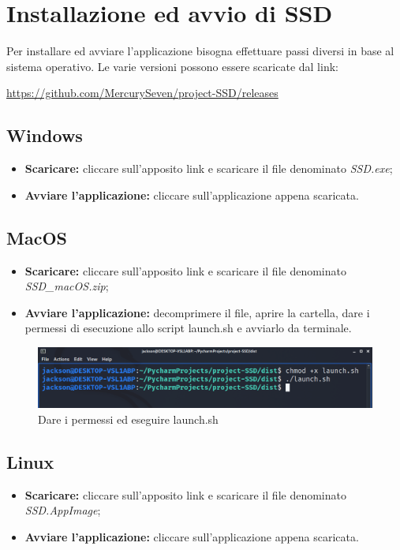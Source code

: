 \section{Installazione ed avvio di SSD}
Per installare ed avviare l'applicazione  bisogna effettuare passi diversi in base al sistema operativo. Le varie versioni possono essere scaricate dal link: \newline{}
\centerline{\url{https://github.com/MercurySeven/project-SSD/releases}}

\subsection{Windows}
\begin{itemize}
\item \textbf{Scaricare:} cliccare sull'apposito link e scaricare il file denominato \textit{SSD.exe};
\item \textbf{Avviare l'applicazione:} cliccare sull'applicazione appena scaricata.
\end{itemize}

\subsection{MacOS}
\begin{itemize}
\item \textbf{Scaricare:} cliccare sull'apposito link e scaricare il file denominato \textit{SSD\_macOS.zip};
\item \textbf{Avviare l'applicazione:} decomprimere il file, aprire la cartella, dare i permessi di esecuzione allo script launch.sh e avviarlo da terminale.
\end{itemize}
\begin{figure}[H]
    \centering
    \includegraphics[scale = 0.3]{components/img/permessi-eseguire-ed-eseguire-launch.png}
    \caption{Dare i permessi ed eseguire launch.sh}
    \label{fig:Dare i permessi ed eseguire launch.sh}
\end{figure}

\subsection{Linux}
\begin{itemize}
\item \textbf{Scaricare:} cliccare sull'apposito link e scaricare il file denominato \textit{SSD.AppImage};
\item \textbf{Avviare l'applicazione:} cliccare sull'applicazione appena scaricata.
\end{itemize}

